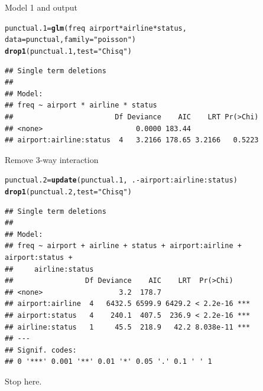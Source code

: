 \documentclass[unknownkeysallowed]{beamer}\usepackage[]{graphicx}\usepackage[]{color}
\makeatletter
\newcommand{\hlstr}[1]{\textcolor[rgb]{0.192,0.494,0.8}{#1}}%
\newcommand{\hlopt}[1]{\textcolor[rgb]{0,0,0}{#1}}%
\newcommand{\hlstd}[1]{\textcolor[rgb]{0.345,0.345,0.345}{#1}}%
\newcommand{\hlkwb}[1]{\textcolor[rgb]{0.69,0.353,0.396}{#1}}%
\newcommand{\hlkwc}[1]{\textcolor[rgb]{0.333,0.667,0.333}{#1}}%
\newcommand{\hlkwd}[1]{\textcolor[rgb]{0.737,0.353,0.396}{\textbf{#1}}}%
\newenvironment{kframe}{%
 \def\at@end@of@kframe{}%
 \ifinner\ifhmode%
  \def\at@end@of@kframe{\end{minipage}}%
  \begin{minipage}{\columnwidth}%
 \fi\fi%
 \def\FrameCommand##1{\hskip\@totalleftmargin \hskip-\fboxsep
 \colorbox{shadecolor}{##1}\hskip-\fboxsep
     \hskip-\linewidth \hskip-\@totalleftmargin \hskip\columnwidth}%
 \MakeFramed {\advance\hsize-\width
   \@totalleftmargin\z@ \linewidth\hsize
   \@setminipage}}%
 {\par\unskip\endMakeFramed%
 \at@end@of@kframe}
\newenvironment{knitrout}{}{} %
\makeatother
\begin{document}
\begin{frame}[fragile]{Model 1 and output}

   
\begin{knitrout}\footnotesize
{}\color{fgcolor}\begin{kframe}
\begin{alltt}
\hlstd{punctual.1}\hlkwb{=}\hlkwd{glm}\hlstd{(freq}\hlopt{~}\hlstd{airport}\hlopt{*}\hlstd{airline}\hlopt{*}\hlstd{status,}
    \hlkwc{data}\hlstd{=punctual,}\hlkwc{family}\hlstd{=}\hlstr{"poisson"}\hlstd{)}
\hlkwd{drop1}\hlstd{(punctual.1,}\hlkwc{test}\hlstd{=}\hlstr{"Chisq"}\hlstd{)}
\end{alltt}
\begin{verbatim}
## Single term deletions
## 
## Model:
## freq ~ airport * airline * status
##                        Df Deviance    AIC    LRT Pr(>Chi)
## <none>                      0.0000 183.44                
## airport:airline:status  4   3.2166 178.65 3.2166   0.5223
\end{verbatim}
\end{kframe}
\end{knitrout}



  
\end{frame}

\begin{frame}[fragile]{Remove 3-way interaction}

\begin{knitrout}\footnotesize
{}\color{fgcolor}\begin{kframe}
\begin{alltt}
\hlstd{punctual.2}\hlkwb{=}\hlkwd{update}\hlstd{(punctual.1,}\hlopt{~}\hlstd{.}\hlopt{-}\hlstd{airport}\hlopt{:}\hlstd{airline}\hlopt{:}\hlstd{status)}
\hlkwd{drop1}\hlstd{(punctual.2,}\hlkwc{test}\hlstd{=}\hlstr{"Chisq"}\hlstd{)}
\end{alltt}
\begin{verbatim}
## Single term deletions
## 
## Model:
## freq ~ airport + airline + status + airport:airline + airport:status + 
##     airline:status
##                 Df Deviance    AIC    LRT  Pr(>Chi)    
## <none>                  3.2  178.7                     
## airport:airline  4   6432.5 6599.9 6429.2 < 2.2e-16 ***
## airport:status   4    240.1  407.5  236.9 < 2.2e-16 ***
## airline:status   1     45.5  218.9   42.2 8.038e-11 ***
## ---
## Signif. codes:  
## 0 '***' 0.001 '**' 0.01 '*' 0.05 '.' 0.1 ' ' 1
\end{verbatim}
\end{kframe}
\end{knitrout}

Stop here.
  
\end{frame}
\end{document}
